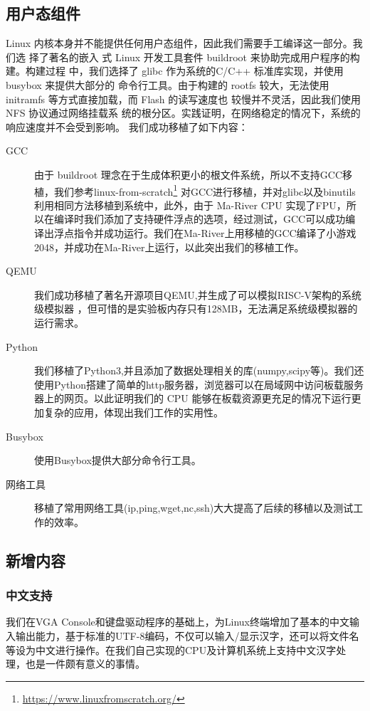 \subsection{用户态组件}
Linux 内核本身并不能提供任何用户态组件，因此我们需要手工编译这一部分。我们选 择了著名的嵌入
式 Linux 开发工具套件 buildroot 来协助完成用户程序的构建。构建过程 中，我们选择了 glibc 作为系统的C/C++ 标准库实现，并使用 busybox 来提供大部分的 命令行工具。由于构建的 rootfs 较大，无法使用
initramfs 等方式直接加载，而 Flash 的读写速度也 较慢并不灵活，因此我们使用 NFS 协议通过网络挂载系
统的根分区。实践证明，在网络稳定的情况下，系统的响应速度并不会受到影响。
我们成功移植了如下内容：
\begin{description}
    \item[GCC] 由于 buildroot 理念在于生成体积更小的根文件系统，所以不支持GCC移植，我们参考linux-from-scratch\footnote{\url{https://www.linuxfromscratch.org/}} 对GCC进行移植，并对glibc以及binutils利用相同方法移植到系统中，此外，由于 Ma-River CPU 实现了FPU，所以在编译时我们添加了支持硬件浮点的选项，经过测试，GCC可以成功编译出浮点指令并成功运行。我们在Ma-River上用移植的GCC编译了小游戏2048，并成功在Ma-River上运行，以此突出我们的移植工作。
    \item[QEMU] 我们成功移植了著名开源项目QEMU,并生成了可以模拟RISC-V架构的系统级模拟器  ，但可惜的是实验板内存只有128MB，无法满足系统级模拟器的运行需求。
    \item[Python] 我们移植了Python3,并且添加了数据处理相关的库(numpy,scipy等)。我们还使用Python搭建了简单的http服务器，浏览器可以在局域网中访问板载服务器上的网页。以此证明我们的 CPU 能够在板载资源更充足的情况下运行更加复杂的应用，体现出我们工作的实用性。
    \item[Busybox] 使用Busybox提供大部分命令行工具。
    \item[网络工具] 移植了常用网络工具(ip,ping,wget,nc,ssh)大大提高了后续的移植以及测试工作的效率。
\end{description}

\subsection{新增内容}
\subsubsection{中文支持}
我们在VGA Console和键盘驱动程序的基础上，为Linux终端增加了基本的中文输入输出能力，基于标准的UTF-8编码，不仅可以输入/显示汉字，还可以将文件名等设为中文进行操作。在我们自己实现的CPU及计算机系统上支持中文汉字处理，也是一件颇有意义的事情。

